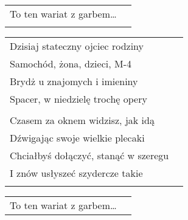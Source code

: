 \documentclass[a5paper]{article}
\begin{document}
\noindent
\begin{tabular}{@{}p{8.5cm}p{3cm}@{}}
To ten wariat z garbem… \\ \\
\end{tabular}

\noindent
\begin{tabular}{@{}p{8.5cm}p{3cm}@{}}
Dzisiaj stateczny ojciec rodziny \\
Samochód, żona, dzieci, M-4 \\
Brydż u znajomych i imieniny \\
Spacer, w niedzielę trochę opery \\ \\
 
Czasem za oknem widzisz, jak idą \\
Dźwigając swoje wielkie plecaki \\
Chciałbyś dołączyć, stanąć w szeregu \\
I znów usłyszeć szydercze takie \\ \\
\end{tabular}

\noindent
\begin{tabular}{@{}p{8.5cm}p{3cm}@{}}
To ten wariat z garbem…
\end{tabular}
\end{document}
